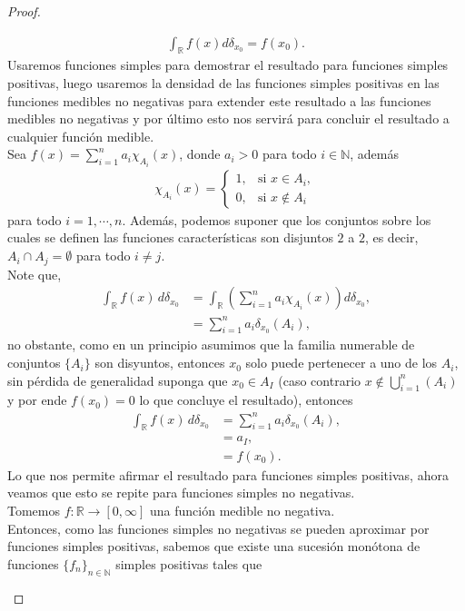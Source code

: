 \begin{enumerate}
\begin{proof}
\begin{enumerate}
      \begin{align*}
        \int_{\mathbb{R}} f(x) d \delta_{x_0}=f\left(x_0\right).
      \end{align*}
      Usaremos funciones simples para demostrar el resultado para funciones simples positivas, luego usaremos la densidad de las funciones simples positivas en las funciones medibles no negativas para extender este resultado a las funciones medibles no negativas y por último esto nos servirá para concluir el resultado a cualquier función medible.\\
      Sea $f(x) = \sum_{i=1}^n a_i \chi_{A_i}(x)$, donde $a_i>0$ para todo $i\in\mathbb{N}$, además 
      \begin{align*}
        \chi_{A_i}(x) = \begin{cases} 
          1, & \text{si } x \in A_i,\\
          0, & \text{si } x \notin A_i
        \end{cases}
      \end{align*}
      para todo $i = 1,\cdots,n$. Además, podemos suponer que los conjuntos sobre los cuales se definen las funciones características son disjuntos $2$ a $2$, es decir, $A_i \cap A_j = \emptyset$ para todo $i \neq j$.\\
      Note que,
      \begin{align*}
        \int_{\mathbb{R}} f(x) \, d\delta_{x_0} &= \int_{\mathbb{R}} \left( \sum_{i=1}^n a_i \chi_{A_i}(x) \right) d\delta_{x_0},\\ 
        &= \sum_{i=1}^n a_i \delta_{x_0}(A_i),
      \end{align*}
      no obstante, como en un principio asumimos que la familia numerable de conjuntos $\{A_i\}$ son disyuntos, entonces $x_0$ solo puede pertenecer a uno de los $A_i$, sin pérdida de generalidad suponga que $x_0\in A_{I}$ (caso contrario $x\notin \bigcup_{i=1}^{n}(A_i)$ y por ende $f(x_0)=0$ lo que concluye el resultado), entonces
      \begin{align*}
        \int_{\mathbb{R}} f(x) \, d\delta_{x_0} &= \sum_{i=1}^n a_i \delta_{x_0}(A_i),\\
        &= a_I,\\
        &= f(x_0).
      \end{align*}
      Lo que nos permite afirmar el resultado para funciones simples positivas, ahora veamos que esto se repite para funciones simples no negativas.\\
      Tomemos $f:\mathbb{R}\to[0, \infty]$ una función medible no negativa.\\ Entonces, como las funciones simples no negativas se pueden aproximar por funciones simples positivas, sabemos que existe una sucesión monótona de funciones $\{f_n\}_{n\in\mathbb{N}}$ simples positivas tales que

\end{enumerate}
\end{proof}
\end{enumerate}
